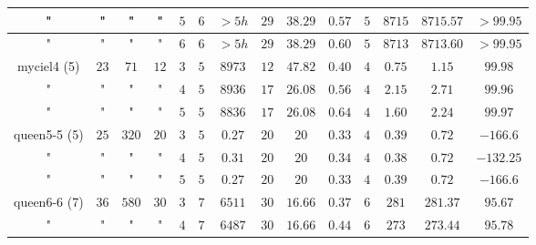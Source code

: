 \documentclass[12pt]{article}
\theoremstyle{slplain}
\begin{document}
\begin{table}[H]
\begin{center}
\begin{tabular}{|c|c|c|c|c|c|c|c|c|c|c|c|c|c|}
\hline
{\small "} & {\small "} & {\small "} & {\small "} & {\small $5$} & {\small $6$} & {\small $>5h$} & {\small $29$}  & {\small $38.29$} & {\small $0.57$}  & {\small $5$} & {\small $8715$} & {\small $8715.57$}  & {\small $>99.95$}\\
\hline
{\small "} & {\small "} & {\small "} & {\small "} & {\small $6$} & {\small $6$} & {\small $>5h$} & {\small $29$}  & {\small $38.29$} & {\small $0.60$} & {\small $5$} & {\small $8713$} & {\small $8713.60$}  & {\small $>99.95$}\\
\hline
\hline
{\small myciel4 (5)} & {\small $23$} & {\small $71$} & {\small $12$} & {\small $3$} & {\small $5$} & {\small $8973$} & {\small $12$}  & {\small $47.82$} & {\small $0.40$} & {\small $4$} & {\small $0.75$} & {\small $1.15$}  & {\small $99.98$}\\
\hline
{\small "} & {\small "} & {\small "} & {\small "} & {\small $4$} & {\small $5$} & {\small $8936$} & {\small $17$}  & {\small $26.08$} & {\small $0.56$} & {\small $4$} & {\small $2.15$} & {\small $2.71$}  & {\small $99.96$}\\
\hline
{\small "} & {\small "} & {\small "} & {\small "} & {\small $5$} & {\small $5$} & {\small $8836$} & {\small $17$}  & {\small $26.08$} & {\small $0.64$} & {\small $4$} & {\small $1.60$} & {\small $2.24$}  & {\small $99.97$}\\
\hline
\hline
{\small queen5-5 (5)} & {\small $25$} & {\small $320$} & {\small $20$} & {\small $3$} & {\small $5$} & {\small $0.27$} & {\small $20$}  & {\small $20$} & {\small $0.33$} & {\small $4$} & {\small $0.39$} & {\small $0.72$}  & {\small $-166.6$}\\
\hline
{\small "} & {\small "} & {\small "} & {\small "} & {\small $4$} & {\small $5$} & {\small $0.31$} & {\small $20$}  & {\small $20$} & {\small $0.34$} & {\small $4$} & {\small $0.38$} & {\small $0.72$}  & {\small $-132.25$}\\
\hline
{\small "} & {\small "} & {\small "} & {\small "} & {\small $5$} & {\small $5$} & {\small $0.27$} & {\small $20$}  & {\small $20$} & {\small $0.33$} & {\small $4$} & {\small $0.39$} & {\small $0.72$}  & {\small $-166.6$}\\
\hline
\hline
{\small queen6-6 (7)} & {\small $36$} & {\small $580$} & {\small $30$} & {\small $3$} & {\small $7$} & {\small $6511$} & {\small $30$}  & {\small $16.66$} & {\small $0.37$} & {\small $6$} & {\small $281$} & {\small $281.37$} & {\small $95.67$}\\
\hline
{\small "} & {\small "} & {\small "} & {\small "} & {\small $4$} & {\small $7$} & {\small $6487$} & {\small $30$}  & {\small $16.66$} & {\small $0.44$} & {\small $6$} & {\small $273$} & {\small $273.44$} & {\small $95.78$}\\

\end{tabular}
\end{center}
\end{table}
\end{document}

